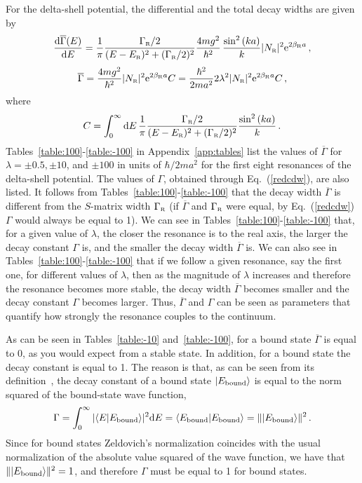 \documentclass[12pt]{article}
\newcommand{\rme}{{\rm e}}
\newcommand{\rmd}{{\rm d}}
\newcommand{\gr}{\Gamma _{\text{\tiny R}}}
\newcommand{\er}{E_{\text{\tiny R}}}
\newcommand{\nr}{N_{\text{\tiny R}}}
\newcommand{\br}{\beta_{\text{\tiny R}}}
\begin{document}
For the delta-shell potential, the differential and the total decay widths
are given by~\cite{NPA15}
\begin{equation}
   \frac{\rmd \overline{\Gamma} (E)}{\rmd E}=\frac{1}{\pi}
       \frac{\gr/2}{(E-\er)^2+(\gr /2)^2} 
        \frac{4mg^2}{\hbar ^2} \,
      \frac{\sin ^2\left(k a \right)}{k} |\nr|^2 \rme^{2\br a}    \, , 
         \label{inteGam6dp}
\end{equation}
\begin{equation}
   \overline{\Gamma}  =  \frac{4mg^2}{\hbar ^2} |\nr|^2 \rme ^{2\br a} C 
         = \frac{\hbar ^2}{2ma^2} 2 \lambda ^2  |\nr|^2 \rme ^{2\br a} C \, ,
     \label{inteGam7dpb}
\end{equation}
where
\begin{equation}
   C = \int_0^{\infty}\rmd E \, \frac{1}{\pi}\frac{\gr/2}{(E-\er)^2+(\gr /2)^2} 
        \frac{\sin ^2\left(k a \right)}{k}  \, .
        \label{constantc}
\end{equation}
Tables~\ref{table:100}-\ref{table:-100} in Appendix~\ref{app:tables} 
list the values of 
$\overline{\Gamma}$ for $\lambda = \pm 0.5, \pm 10$, and $\pm 100$ 
in units of $\hbar /2m a^2$ for the first eight resonances of the
delta-shell potential. The values of $\Gamma$, obtained through 
Eq.~(\ref{redcdw}), are also listed. It follows from 
Tables~\ref{table:100}-\ref{table:-100} that the decay
width $\overline{\Gamma}$ is different from the $S$-matrix width
$\gr$ (if $\overline{\Gamma}$ and $\gr$ were equal,
by Eq.~(\ref{redcdw}) $\Gamma$ would always be equal to 1). We can see in 
Tables~\ref{table:100}-\ref{table:-100} that, for a given value of 
$\lambda$, the closer the resonance is to the real axis, the 
larger the decay constant $\Gamma$ is, and the smaller the decay width 
$\overline{\Gamma}$ is. We can also see 
in Tables~\ref{table:100}-\ref{table:-100} that if we follow a given
resonance, say the first one, for different values of $\lambda$, then
as the magnitude of $\lambda$ increases and therefore the resonance
becomes more stable, the decay width $\overline{\Gamma}$ becomes smaller and 
the decay constant $\Gamma$ becomes larger. Thus, $\overline{\Gamma}$
and $\Gamma$ can be seen as parameters that quantify how strongly the 
resonance couples to the continuum.

As can be seen in Tables~\ref{table:-10} and~\ref{table:-100}, for a bound 
state $\overline{\Gamma}$ is equal to 0, as you would expect from a 
stable state. In 
addition, for a bound state the decay constant is equal to 1. The reason
is that, as can be seen from its definition~\cite{NPA15}, the
decay constant of a bound state $|E_{\rm bound}\rangle$ is equal to the 
norm squared of the bound-state wave function,
\begin{equation}
      \Gamma = \int_0^{\infty} 
    |\langle E|E_{\rm bound}\rangle |^2 \rmd E = 
       \langle E_{\rm bound}|E_{\rm bound}\rangle = 
      \| |E_{\rm bound} \rangle \| ^2 \, .
\end{equation}
Since for bound states Zeldovich's normalization coincides with the usual 
normalization of the absolute value squared of 
the wave function, we have that $\| |E_{\rm bound} \rangle \| ^2=1$,
and therefore $\Gamma$ must be equal to 1 for bound states. 
\end{document}
